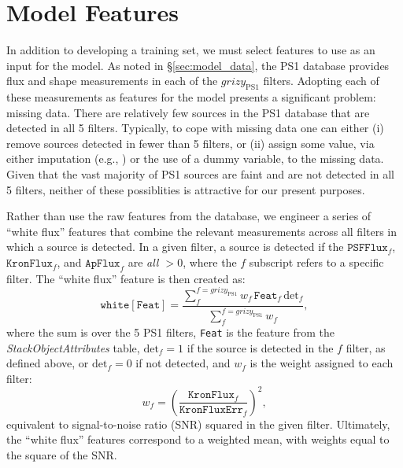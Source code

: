 \documentclass[twocolumn]{aastex62}
\begin{document}
\section{Model Features}\label{sec:model_features}

In addition to developing a training set, we must select features to use as an input for the model. As noted in \S\ref{sec:model_data}, the PS1 database provides flux and shape measurements in each of the $grizy_\mathrm{PS1}$ filters. Adopting each of these measurements as features for the model presents a significant problem: missing data. There are relatively few sources in the PS1 database that are detected in all 5 filters. Typically, to cope with missing data one can either (i) remove sources detected in fewer than 5 filters, or (ii) assign some value, via either imputation (e.g., \citealt{Miller17}) or the use of a dummy variable, to the missing data. Given that the vast majority of PS1 sources are faint and are not detected in all 5 filters, neither of these possiblities is attractive for our present purposes.

Rather than use the raw features from the database, we engineer a series of ``white flux'' features that combine the relevant measurements across all filters in which a source is detected. In a given filter, a source is detected if the $\mathtt{PSFFlux}_f$, $\mathtt{KronFlux}_f$, and $\mathtt{ApFlux}_f$ are \textit{all $> 0$}, where the $f$ subscript refers to a specific filter. The ``white flux'' feature is then created as:
%
\begin{equation}
    \mathtt{white[Feat]} =  \frac{\sum_f^{f = grizy_\mathrm{PS1}} w_f  \, \mathtt{Feat}_f \, \mathrm{det}_f}{\sum_f^{f = grizy_\mathrm{PS1}} w_f}, 
\end{equation}
%
where the sum is over the 5 PS1 filters, \texttt{Feat} is the feature from the \textit{StackObjectAttributes} table, $\mathrm{det}_f = 1$ if the source is detected in the $f$ filter, as defined above, or $\mathrm{det}_f = 0$ if not detected, and $w_f$ is the weight assigned to each filter:
%
\begin{equation}
    w_f = \left(\frac{\mathtt{KronFlux}_f}{\mathtt{KronFluxErr}_f}\right)^2,
\end{equation}
%
equivalent to signal-to-noise ratio (SNR) squared in the given filter. Ultimately, the ``white flux'' features correspond to a weighted mean, with weights equal to the square of the SNR. 
\end{document}

